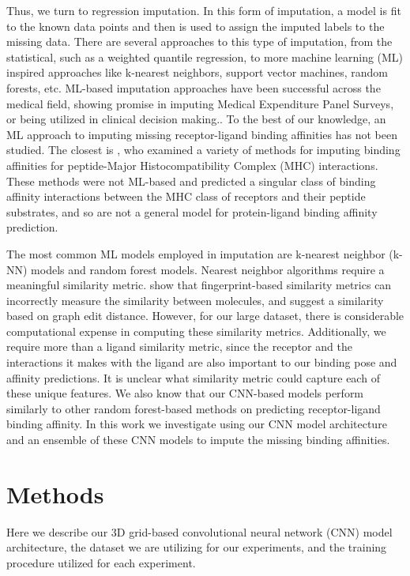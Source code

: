 \documentclass[journal=jcim,manuscript=article]{achemso}
\begin{document}
Thus, we turn to regression imputation.
In this form of imputation, a model is fit to the known data points and then is used to assign the imputed labels to the missing data.
There are several approaches to this type of imputation, from the statistical, such as a weighted quantile regression, to more machine learning (ML) inspired approaches like k-nearest neighbors, support vector machines, random forests, etc.\cite{rev1support,review2}
ML-based imputation approaches have been successful across the medical field, showing promise in imputing Medical Expenditure Panel Surveys\cite{MLimpMedsurvey}, or being utilized in clinical decision making.\cite{MLclinicDecision}.
To the best of our knowledge, an ML approach to imputing missing receptor-ligand binding affinities has not been studied.
The closest is \citet{peptideMHCimp}, who examined a variety of methods for imputing binding affinities for peptide-Major Histocompatibility Complex (MHC) interactions.
These methods were not ML-based and predicted a singular class of binding affinity interactions between the MHC class of receptors and their peptide substrates,\cite{peptideMHCimp} and so are not a general model for protein-ligand binding affinity prediction.

The most common ML models employed in imputation are k-nearest neighbor (k-NN) models and random forest models.\cite{review2}  Nearest neighbor algorithms require a meaningful similarity metric.
 \citet{graphEditDist} show that fingerprint-based similarity metrics can incorrectly measure the similarity between molecules, and suggest a similarity based on graph edit distance.
However, for our large dataset, there is considerable computational expense in computing these similarity metrics. 
Additionally, we require more than a ligand similarity metric, since the receptor and the interactions it makes with the ligand are also important to our binding pose and affinity predictions.
It is unclear what similarity metric could capture each of these unique features.
We also know that our CNN-based models perform similarly to other random forest-based methods on predicting receptor-ligand binding affinity.\cite{crossdocked2020}
In this work we investigate using our CNN model architecture and an ensemble of these CNN models to impute the missing binding affinities.

\section{Methods}
Here we describe our 3D grid-based convolutional neural network (CNN) model architecture, the dataset we are utilizing for our experiments, and the training procedure utilized for each experiment.
\end{document}
